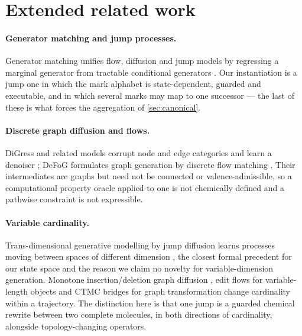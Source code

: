 

\section{Extended related work}
\label{app:related}

\paragraph{Generator matching and jump processes.}
Generator matching unifies flow, diffusion and jump models by regressing a marginal generator from tractable conditional generators \citep{holderrieth2025generator}. Our instantiation is a jump one in which the mark alphabet is state-dependent, guarded and executable, and in which several marks may map to one successor --- the last of these is what forces the aggregation of \cref{sec:canonical}.

\paragraph{Discrete graph diffusion and flows.}
DiGress and related models corrupt node and edge categories and learn a denoiser \citep{vignac2023digress,austin2021d3pm,campbell2022ctdd}; DeFoG formulates graph generation by discrete flow matching \citep{qin2025defog}. Their intermediates are graphs but need not be connected or valence-admissible, so a computational property oracle applied to one is not chemically defined and a pathwise constraint is not expressible.

\paragraph{Variable cardinality.}
Trans-dimensional generative modelling by jump diffusion learns processes moving between spaces of different dimension \citep{campbell2023jump}, the closest formal precedent for our state space and the reason we claim no novelty for variable-dimension generation. Monotone insertion/deletion graph diffusion \citep{ninniri2025griddd}, edit flows for variable-length objects \citep{havasi2025editflows} and CTMC bridges for graph transformation \citep{kim2025ddsbm} change cardinality within a trajectory. The distinction here is that one jump is a guarded chemical rewrite between two complete molecules, in both directions of cardinality, alongside topology-changing operators.

